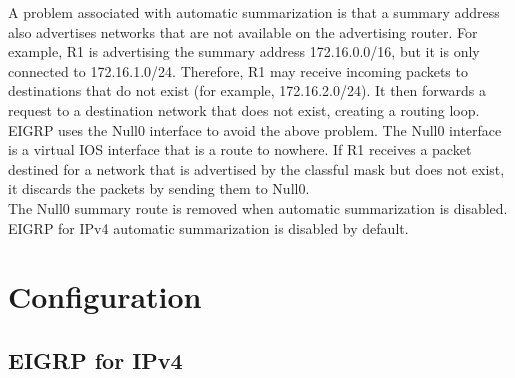 A problem associated with automatic summarization is that a summary address also advertises networks that are not available on the advertising router. For example, R1 is advertising the summary address 172.16.0.0/16, but it is only connected to 172.16.1.0/24. Therefore, R1 may receive incoming packets to destinations that do not exist (for example, 172.16.2.0/24). It then forwards a request to a destination network that does not exist, creating a routing loop.\\

EIGRP uses the Null0 interface to avoid the above problem. The Null0 interface is a virtual IOS interface that is a route to nowhere. If R1 receives a packet destined for a network that is advertised by the classful mask but does not exist, it discards the packets by sending them to Null0.\\
 
\note The Null0 summary route is removed when automatic summarization is disabled.\\
\note EIGRP for IPv4 automatic summarization is disabled by default.

\section{Configuration}

\subsection{EIGRP for IPv4}


